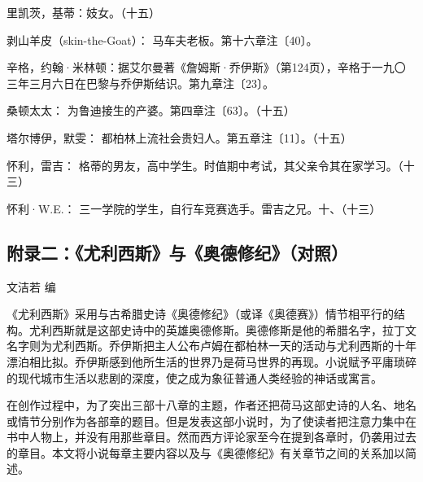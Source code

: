 \par 里凯茨，基蒂：妓女。（十五）
\par 剥山羊皮（skin-the-Goat）： 马车夫老板。第十六章注〔40〕。
\par 辛格，约翰·米林顿：据艾尔曼著《詹姆斯·乔伊斯》（第124页），辛格于一九〇三年三月六日在巴黎与乔伊斯结识。第九章注〔23〕。
\par 桑顿太太： 为鲁迪接生的产婆。第四章注〔63〕。（十五）
\par 塔尔博伊，默雯： 都柏林上流社会贵妇人。第五章注〔11〕。（十五）
\par 怀利，雷吉： 格蒂的男友，高中学生。时值期中考试，其父亲令其在家学习。（十三）
\par 怀利·W.E.： 三一学院的学生，自行车竞赛选手。雷吉之兄。十、（十三）


\clearpage
\subsection*{附录二：《尤利西斯》与《奥德修纪》（对照）}

\begin{center}
    文洁若 编
\end{center}

\par 《尤利西斯》采用与古希腊史诗《奥德修纪》（或译《奥德赛》）情节相平行的结构。尤利西斯就是这部史诗中的英雄奥德修斯。奥德修斯是他的希腊名字，拉丁文名字则为尤利西斯。乔伊斯把主人公布卢姆在都柏林一天的活动与尤利西斯的十年漂泊相比拟。乔伊斯感到他所生活的世界乃是荷马世界的再现。小说赋予平庸琐碎的现代城市生活以悲剧的深度，使之成为象征普通人类经验的神话或寓言。
\par 在创作过程中，为了突出三部十八章的主题，作者还把荷马这部史诗的人名、地名或情节分别作为各部章的题目。但是发表这部小说时，为了使读者把注意力集中在书中人物上，并没有用那些章目。然而西方评论家至今在提到各章时，仍袭用过去的章目。本文将小说每章主要内容以及与《奥德修纪》有关章节之间的关系加以简述。

